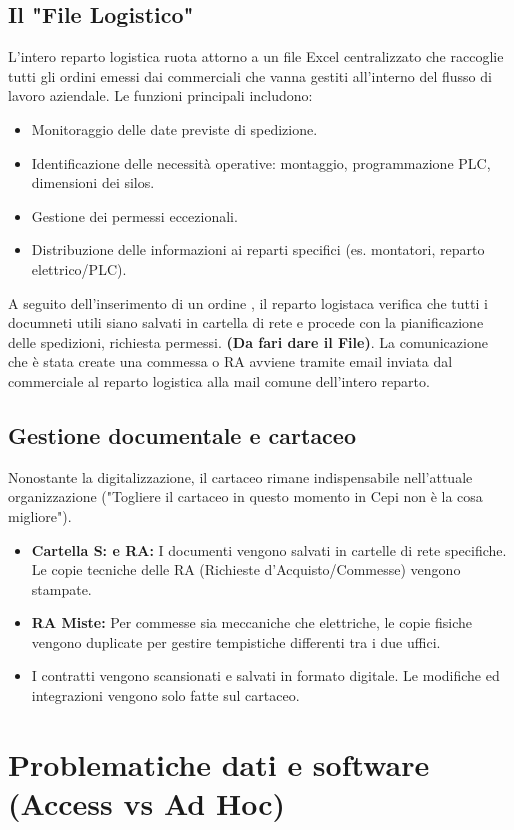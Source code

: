 \documentclass[12pt, a4paper]{article} %
\begin{document}
\subsection{Il "File Logistico"}
L'intero reparto logistica ruota attorno a un file Excel centralizzato che
raccoglie tutti gli ordini emessi dai commerciali che vanna gestiti all'interno
del flusso di lavoro aziendale. Le funzioni principali includono:
\begin{itemize}
    \item Monitoraggio delle date previste di spedizione.
    \item Identificazione delle necessità operative: montaggio, programmazione PLC,
          dimensioni dei silos.
    \item Gestione dei permessi eccezionali.
    \item Distribuzione delle informazioni ai reparti specifici (es. montatori, reparto
          elettrico/PLC).
\end{itemize}
A seguito dell'inserimento di un ordine , il reparto logistaca verifica che tutti i documneti utili siano salvati in cartella di rete e procede con la pianificazione delle spedizioni, richiesta permessi.
\textbf{(Da fari dare il File)}.
La comunicazione che è stata create una commessa o RA avviene tramite email inviata dal commerciale al reparto logistica alla  mail comune dell'intero reparto.

\subsection{Gestione documentale e cartaceo}
Nonostante la digitalizzazione, il cartaceo rimane indispensabile nell'attuale
organizzazione ("Togliere il cartaceo in questo momento in Cepi non è la cosa
migliore").
\begin{itemize}
    \item \textbf{Cartella S: e RA:} I documenti vengono salvati in cartelle di rete specifiche. Le copie tecniche delle RA (Richieste d'Acquisto/Commesse) vengono stampate.
    \item \textbf{RA Miste:} Per commesse sia meccaniche che elettriche, le copie fisiche vengono duplicate per gestire tempistiche differenti tra i due uffici.
    \item I contratti vengono scansionati e salvati in formato digitale. Le modifiche ed
          integrazioni vengono solo fatte sul cartaceo.
\end{itemize}

\section{Problematiche dati e software (Access vs Ad Hoc)}
\end{document}
